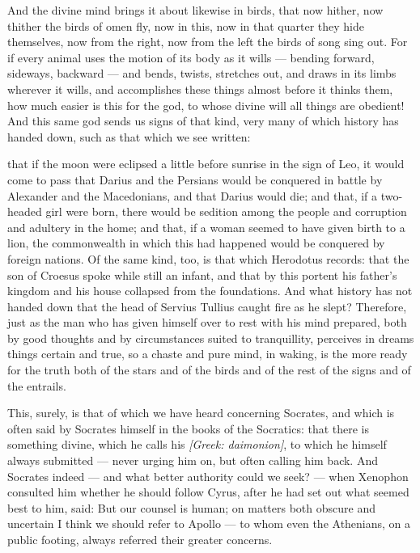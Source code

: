  And the divine mind brings it about likewise in birds, that now hither, now thither the birds of omen fly, now in this, now in that quarter they hide themselves, now from the right, now from the left the birds of song sing out. For if every animal uses the motion of its body as it wills — bending forward, sideways, backward — and bends, twists, stretches out, and draws in its limbs wherever it wills, and accomplishes these things almost before it thinks them, how much easier is this for the god, to whose divine will all things are obedient! And this same god sends us signs of that kind, very many of which history has handed down, such as that which we see written:

 that if the moon were eclipsed a little before sunrise in the sign of Leo, it would come to pass that Darius and the Persians would be conquered in battle by Alexander and the Macedonians, and that Darius would die; and that, if a two-headed girl were born, there would be sedition among the people and corruption and adultery in the home; and that, if a woman seemed to have given birth to a lion, the commonwealth in which this had happened would be conquered by foreign nations. Of the same kind, too, is that which Herodotus records: that the son of Croesus spoke while still an infant, and that by this portent his father's kingdom and his house collapsed from the foundations. And what history has not handed down that the head of Servius Tullius caught fire as he slept? Therefore, just as the man who has given himself over to rest with his mind prepared, both by good thoughts and by circumstances suited to tranquillity, perceives in dreams things certain and true, so a chaste and pure mind, in waking, is the more ready for the truth both of the stars and of the birds and of the rest of the signs and of the entrails.

 This, surely, is that of which we have heard concerning Socrates, and which is often said by Socrates himself in the books of the Socratics: that there is something divine, which he calls his \textit{[Greek: daimonion]}, to which he himself always submitted — never urging him on, but often calling him back. And Socrates indeed — and what better authority could we seek? — when Xenophon consulted him whether he should follow Cyrus, after he had set out what seemed best to him, said: But our counsel is human; on matters both obscure and uncertain I think we should refer to Apollo — to whom even the Athenians, on a public footing, always referred their greater concerns.

